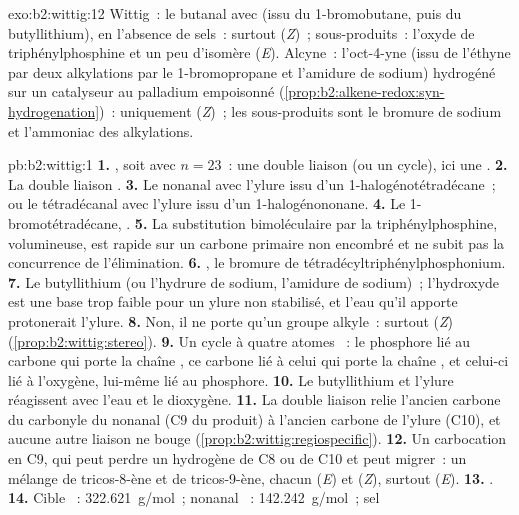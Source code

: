 \begin{solution}{exo:b2:wittig:12}
Wittig~: le butanal avec  (issu du 1-bromobutane, puis du butyllithium), en
l'absence de sels~: surtout (\textit{Z})~; sous-produits~: l'oxyde de triphénylphosphine et un peu
d'isomère (\textit{E}). Alcyne~: l'oct-4-yne (issu de l'éthyne par deux alkylations par le
1-bromopropane et l'amidure de sodium) hydrogéné sur un catalyseur au palladium empoisonné
(\cref{prop:b2:alkene-redox:syn-hydrogenation})~: uniquement (\textit{Z})~; les sous-produits sont le
bromure de sodium et l'ammoniac des alkylations.
\end{solution}

\begin{solution}{pb:b2:wittig:1}
\textbf{1.} , soit  avec $n = 23$~: une double liaison (ou un cycle), ici une
.
\textbf{2.} La double liaison .
\textbf{3.} Le nonanal  avec l'ylure issu d'un 1-halogénotétradécane~; ou le tétradécanal
 avec l'ylure issu d'un 1-halogénononane.
\textbf{4.} Le 1-bromotétradécane, .
\textbf{5.} La substitution bimoléculaire par la triphénylphosphine, volumineuse, est rapide sur un
carbone primaire non encombré et ne subit pas la concurrence de l'élimination.
\textbf{6.} , le bromure de tétradécyltriphénylphosphonium.
\textbf{7.} Le butyllithium (ou l'hydrure de sodium, l'amidure de sodium)~; l'hydroxyde est une base trop
faible pour un ylure non stabilisé, et l'eau qu'il apporte protonerait l'ylure.
\textbf{8.} Non, il ne porte qu'un groupe alkyle~: surtout (\textit{Z}) (\cref{prop:b2:wittig:stereo}).
\textbf{9.} Un cycle à quatre atomes ~: le phosphore lié au carbone qui porte la chaîne
, ce carbone lié à celui qui porte la chaîne , et celui-ci lié à l'oxygène, lui-même
lié au phosphore.
\textbf{10.} Le butyllithium et l'ylure réagissent avec l'eau et le dioxygène.
\textbf{11.} La double liaison relie l'ancien carbone du carbonyle du nonanal (C9 du produit) à l'ancien
carbone de l'ylure (C10), et aucune autre liaison ne bouge (\cref{prop:b2:wittig:regiospecific}).
\textbf{12.} Un carbocation en C9, qui peut perdre un hydrogène de C8 ou de C10 et peut migrer~: un mélange
de tricos-8-ène et de tricos-9-ène, chacun (\textit{E}) et (\textit{Z}), surtout (\textit{E}).
\textbf{13.} .
\textbf{14.} Cible ~: \qty{322.621}{g/mol}~; nonanal ~: \qty{142.242}{g/mol}~; sel

\end{solution}
